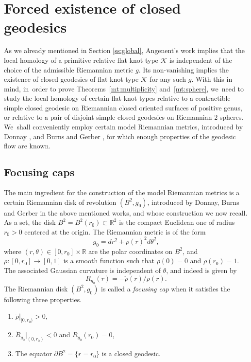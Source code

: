 \documentclass[JEP,XML,SOM,Unicode,NoFloatCountersInSection,published]{cedram}
\newcommand{\R}{\mathbb{R}}
\newcommand{\KK}{\mathcal{K}}
\theoremstyle{plain}
\theoremstyle{definition}
\begin{document}
\section{Forced existence of closed geodesics}
\label{s:forcing}

As we already mentioned in Section \ref{ss:global}, Angenent's work \cite{Angenent:2005aa} implies that the local homology of a primitive relative flat knot type $\KK$ is independent of the choice of the admissible Riemannian metric $g$.
Its non-vanishing implies the existence of closed geodesics of flat knot type $\KK$ for any such $g$. With this in mind, in~order to prove Theorems~\ref{mt:multiplicity} and~\ref{mt:sphere}, we~need to study the local homology of certain flat knot types relative to a contractible simple closed geodesic on Riemannian closed oriented surfaces of positive genus, or relative to a pair of disjoint simple closed geodesics on Riemannian $2$-spheres. We~shall conveniently employ certain model Riemannian metrics, introduced by Donnay \cite{Donnay:1988ab}, and Burns and Gerber \cite{Burns:1989aa}, for which enough properties of the geodesic flow are known.

\subsection{Focusing caps}
The main ingredient for the construction of the model Riemannian metrics is a certain Riemannian disk of revolution $(B^2,g_0)$, introduced by Donnay, Burns and Gerber in the above mentioned works, and whose construction we now recall.
As a set, the disk $B^2=B^2(r_0)\subset\R^2$ is the compact Euclidean one of radius $r_0>0$ centered at the origin. The Riemannian metric is of the form
\[
g_0 = dr^2+\rho(r)^2d\theta^2,
\]
where $(r,\theta)\in[0,r_0]\times\R$ are the polar coordinates on $B^2$, and $\rho:[0,r_0]\to[0,1]$ is a smooth function such that $\rho(0)=0$ and $\rho(r_0)=1$. The associated Gaussian curvature is independent of $\theta$, and indeed is given by
\[
R_{g_0}(r)=-\ddot\rho(r)/\rho(r).
\]
The Riemannian disk $(B^2,g_0)$ is called a \emph{focusing cap} when it satisfies the following three properties.
\begin{enumerate}
\item
$\dot\rho|_{[0,r_0)}>0$,

\item
$\dot R_{g_0}|_{(0,r_0)}<0$ and $R_{g_0}(r_0)=0$,

\item
The equator $\partial B^2=\{r=r_0\}$ is a closed geodesic.
\end{enumerate}
\end{document}

